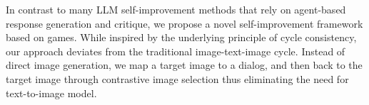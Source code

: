 In contrast to many LLM self-improvement methods that rely on agent-based response generation and critique, we propose a novel self-improvement framework based on games. 
While inspired by the underlying principle of cycle consistency, our approach deviates from the traditional image-text-image cycle.
Instead of direct image generation, we map a target image to a dialog, and then back to the target image through contrastive image selection thus eliminating the need for text-to-image model.